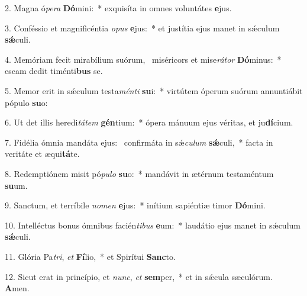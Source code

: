 2. Magna ó\textit{pe}\textit{ra} \textbf{Dó}mini:~*  exquisíta in omnes voluntátes \textbf{e}jus.\

3. Conféssio et magnificéntia \textit{o}\textit{pus} \textbf{e}jus:~*  et justítia ejus manet in sǽculum \textbf{sǽ}culi.\

4. Memóriam fecit mirabílium suórum, \dag\  miséricors et mise\textit{rá}\textit{tor} \textbf{Dó}minus:~*  escam dedit timénti\textbf{bus} se.\

5. Memor erit in sǽculum testa\textit{mén}\textit{ti} \textbf{su}i:~*  virtútem óperum suórum annuntiábit pópulo \textbf{su}o:\

6. Ut det illis heredi\textit{tá}\textit{tem} \textbf{gén}tium:~*  ópera mánuum ejus véritas, et ju\textbf{dí}cium.\

7. Fidélia ómnia mandáta ejus: \dag\  confirmáta in sǽ\textit{cu}\textit{lum} \textbf{sǽ}culi,~*  facta in veritáte et æqui\textbf{tá}te.\

8. Redemptiónem misit pó\textit{pu}\textit{lo} \textbf{su}o:~*  mandávit in ætérnum testaméntum \textbf{su}um.\

9. Sanctum, et terríbile \textit{no}\textit{men} \textbf{e}jus:~*  inítium sapiéntiæ timor \textbf{Dó}mini.\

10. Intelléctus bonus ómnibus facién\textit{ti}\textit{bus} \textbf{e}um:~*  laudátio ejus manet in sǽculum \textbf{sǽ}culi.\

11. Glória Pa\textit{tri}, \textit{et} \textbf{Fí}lio,~*  et Spirítui \textbf{Sanc}to.\

12. Sicut erat in princípio, et \textit{nunc}, \textit{et} \textbf{sem}per,~*  et in sǽcula sæculórum. \textbf{A}men.\


